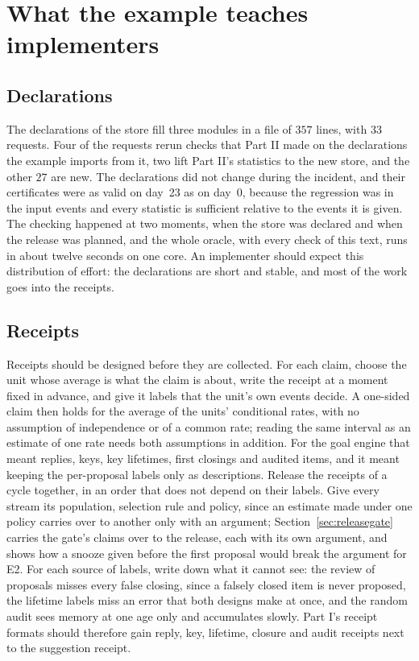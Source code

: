 \documentclass[11pt]{article}
\theoremstyle{definition}
\theoremstyle{plain}
\begin{document}
\section{What the example teaches implementers}\label{sec:lessons}

\subsection{Declarations}

The declarations of the store fill three modules in a file of $357$ lines, with $33$ requests. Four
of the requests rerun checks that Part II made on the declarations the example imports from it, two
lift Part II's statistics to the new store, and the other $27$ are new. The declarations did not
change during the incident, and their certificates were as valid on day~23 as on day~0, because
the regression was in the input events and every statistic is sufficient relative to the events it
is given. The checking happened at two moments, when the store was declared and when the release
was planned, and the whole oracle, with every check of this text, runs in about twelve seconds on
one core. An implementer should expect this distribution of effort: the declarations are short and
stable, and most of the work goes into the receipts.

\subsection{Receipts}

Receipts should be designed before they are collected. For each claim, choose the unit whose
average is what the claim is about, write the receipt at a moment fixed in advance, and give it
labels that the unit's own events decide. A one-sided claim then holds for the average of the
units' conditional rates, with no assumption of independence or of a common rate; reading the same
interval as an estimate of one rate needs both assumptions in addition. For the goal engine
that meant replies, keys, key lifetimes, first closings and audited items, and it meant keeping the
per-proposal labels only as descriptions. Release the receipts of a cycle together, in an order that
does not depend on their labels. Give every stream its population, selection rule and policy, since
an estimate made under one policy carries over to another only with an argument;
Section~\ref{sec:releasegate} carries the gate's claims over to the release, each with its own
argument, and shows how a snooze given before the first proposal would break the argument for
E2. For each source of labels, write down what it cannot see: the
review of proposals misses every false closing, since a falsely closed item is never proposed, the
lifetime labels miss an error that both designs make at once, and the random audit sees memory at
one age only and accumulates slowly. Part I's receipt formats \cite[Appendix~C.4]{part1} should
therefore gain reply, key, lifetime, closure and audit receipts next to the suggestion receipt.
\end{document}
